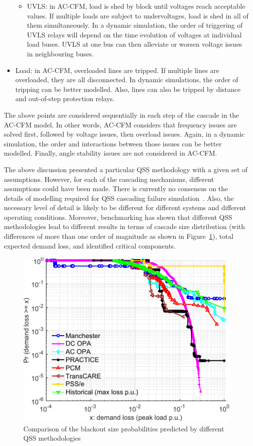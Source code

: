 \begin{itemize}
\begin{itemize}
        \item UVLS: in AC-CFM, load is shed by block until voltages reach acceptable values. If multiple loads are subject to undervoltages, load is shed in all of them simultaneously. In a dynamic simulation, the order of triggering of UVLS relays will depend on the time evolution of voltages at individual load buses. UVLS at one bus can then alleviate or worsen voltage issues in neighbouring buses.
    \end{itemize}
    \item Load: in AC-CFM, overloaded lines are tripped. If multiple lines are overloaded, they are all disconnected. In dynamic simulations, the order of tripping can be better modelled. Also, lines can also be tripped by distance and out-of-step protection relays.
\end{itemize}

The above points are considered sequentially in each step of the cascade in the AC-CFM model. In other words, AC-CFM considers that frequency issues are solved first, followed by voltage issues, then overload issues. Again, in a dynamic simulation, the order and interactions between those issues can be better modelled. Finally, angle stability issues are not considered in AC-CFM.

The above discussion presented a particular QSS methodology with a given set of assumptions. However, for each of the cascading mechanisms, different assumptions could have been made. There is currently no consensus on the details of modelling required for QSS cascading failure simulation~\cite{Benchmarking2018, BenefitsAndChallengesDynamicPreece}. Also, the necessary level of detail is likely to be different for different systems and different operating conditions. Moreover, benchmarking has shown that different QSS methodologies lead to different results in terms of cascade size distribution (with differences of more than one order of magnitude as shown in Figure~\ref{fig:QSS_ccdf}), total expected demand loss, and identified critical components.

\begin{figure}
    \centering
    \includegraphics[width=0.6\linewidth]{Figs/QSS_ccdf.pdf}
    \caption{Comparison of the blackout size probabilities predicted by different QSS methodologies~\cite{Benchmarking2018}}
    \label{fig:QSS_ccdf}
\end{figure}

